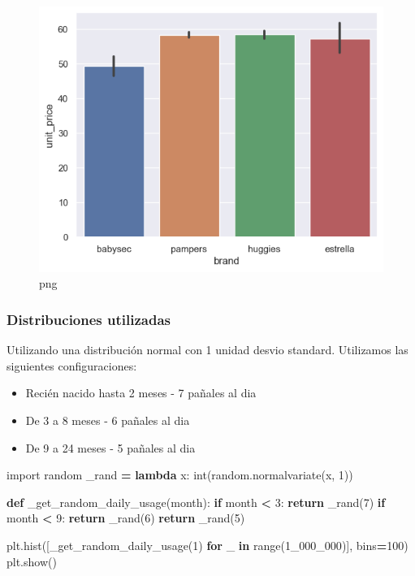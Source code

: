 \documentclass[
]{article}
\newenvironment{Shaded}{\begin{snugshade}}{\end{snugshade}}
\newcommand{\BuiltInTok}[1]{#1}
\newcommand{\ControlFlowTok}[1]{\textcolor[rgb]{0.13,0.29,0.53}{\textbf{#1}}}
\newcommand{\DecValTok}[1]{\textcolor[rgb]{0.00,0.00,0.81}{#1}}
\newcommand{\ImportTok}[1]{#1}
\newcommand{\KeywordTok}[1]{\textcolor[rgb]{0.13,0.29,0.53}{\textbf{#1}}}
\newcommand{\NormalTok}[1]{#1}
\newcommand{\OperatorTok}[1]{\textcolor[rgb]{0.81,0.36,0.00}{\textbf{#1}}}
\providecommand{\tightlist}{%
  \setlength{\itemsep}{0pt}\setlength{\parskip}{0pt}}
\begin{document}
\begin{figure}
\centering
\includegraphics{output_11_0.png}
\caption{png}
\end{figure}

\hypertarget{distribuciones-utilizadas}{%
\subsubsection{Distribuciones
utilizadas}\label{distribuciones-utilizadas}}

Utilizando una distribución normal con 1 unidad desvio standard.
Utilizamos las siguientes configuraciones:

\begin{itemize}
\tightlist
\item
  Recién nacido hasta 2 meses - 7 pañales al dia
\item
  De 3 a 8 meses - 6 pañales al dia
\item
  De 9 a 24 meses - 5 pañales al dia
\end{itemize}

\begin{Shaded}
\begin{Highlighting}[]
\ImportTok{import}\NormalTok{ random}
\NormalTok{\_rand }\OperatorTok{=} \KeywordTok{lambda}\NormalTok{ x: }\BuiltInTok{int}\NormalTok{(random.normalvariate(x, }\DecValTok{1}\NormalTok{))}


\KeywordTok{def}\NormalTok{ \_get\_random\_daily\_usage(month):}
    \ControlFlowTok{if}\NormalTok{ month }\OperatorTok{\textless{}} \DecValTok{3}\NormalTok{:}
        \ControlFlowTok{return}\NormalTok{ \_rand(}\DecValTok{7}\NormalTok{)}
    \ControlFlowTok{if}\NormalTok{ month }\OperatorTok{\textless{}} \DecValTok{9}\NormalTok{:}
        \ControlFlowTok{return}\NormalTok{ \_rand(}\DecValTok{6}\NormalTok{)}
    \ControlFlowTok{return}\NormalTok{ \_rand(}\DecValTok{5}\NormalTok{)}

\NormalTok{plt.hist([\_get\_random\_daily\_usage(}\DecValTok{1}\NormalTok{) }\ControlFlowTok{for}\NormalTok{ \_ }\KeywordTok{in} \BuiltInTok{range}\NormalTok{(}\DecValTok{1\_000\_000}\NormalTok{)], bins}\OperatorTok{=}\DecValTok{100}\NormalTok{)}
\NormalTok{plt.show()}
\end{Highlighting}
\end{Shaded}
\end{document}
